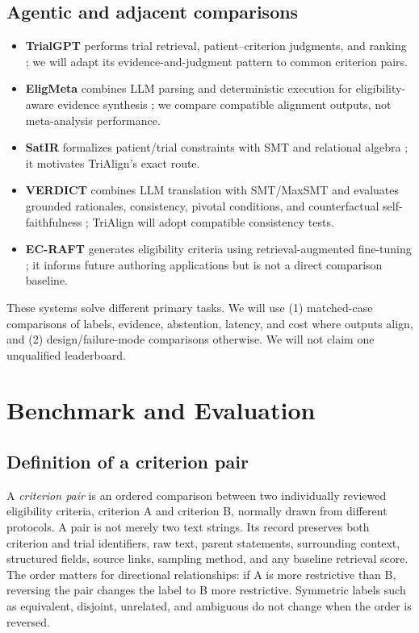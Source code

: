 \documentclass[10pt]{article}
\begin{document}
\subsection{Agentic and adjacent comparisons}
\begin{itemize}
\item \textbf{TrialGPT} performs trial retrieval, patient--criterion judgments, and ranking \cite{trialgpt}; we will adapt its evidence-and-judgment pattern to common criterion pairs.
\item \textbf{EligMeta} combines LLM parsing and deterministic execution for eligibility-aware evidence synthesis \cite{eligmeta}; we compare compatible alignment outputs, not meta-analysis performance.
\item \textbf{SatIR} formalizes patient/trial constraints with SMT and relational algebra \cite{satir}; it motivates TriAlign's exact route.
\item \textbf{VERDICT} combines LLM translation with SMT/MaxSMT and evaluates grounded rationales, consistency, pivotal conditions, and counterfactual self-faithfulness \cite{verdict}; TriAlign will adopt compatible consistency tests.
\item \textbf{EC-RAFT} generates eligibility criteria using retrieval-augmented fine-tuning \cite{ecraft}; it informs future authoring applications but is not a direct comparison baseline.
\end{itemize}
These systems solve different primary tasks. We will use (1) matched-case comparisons of labels, evidence, abstention, latency, and cost where outputs align, and (2) design/failure-mode comparisons otherwise. We will not claim one unqualified leaderboard.

\section{Benchmark and Evaluation}
\subsection{Definition of a criterion pair}
A \emph{criterion pair} is an ordered comparison between two individually reviewed eligibility criteria, criterion A and criterion B, normally drawn from different protocols. A pair is not merely two text strings. Its record preserves both criterion and trial identifiers, raw text, parent statements, surrounding context, structured fields, source links, sampling method, and any baseline retrieval score. The order matters for directional relationships: if A is more restrictive than B, reversing the pair changes the label to B more restrictive. Symmetric labels such as equivalent, disjoint, unrelated, and ambiguous do not change when the order is reversed.
\end{document}
